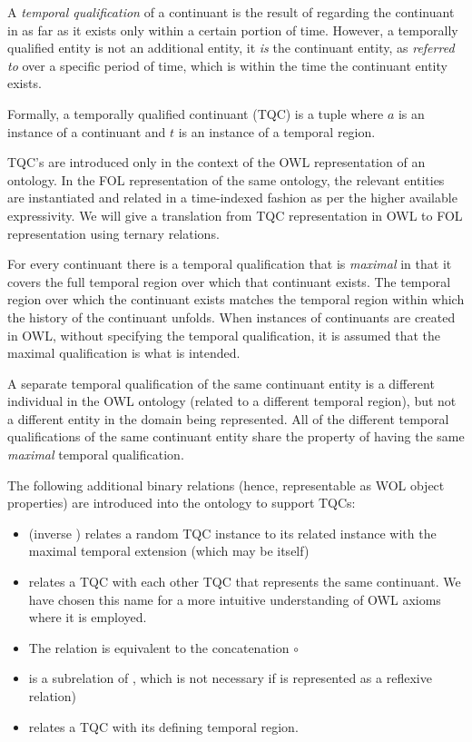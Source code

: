 
A \emph{temporal qualification} of a
continuant is the result of regarding the continuant in as far as it exists only
within a certain portion of time. However, a temporally qualified entity is
not an additional entity, it \emph{is} the continuant entity, as \emph{referred to}
over a specific period of time, which is within the time the continuant entity
exists.

Formally, a temporally qualified continuant (TQC) is a tuple 
where $a$ is an instance
of a continuant and $t$ is an instance of a temporal region.

TQC's are introduced only in the context of the OWL representation of
an ontology. In the FOL representation of the same ontology, the relevant
entities are instantiated and related in a time-indexed fashion
as per the higher available expressivity.
We will give a translation from TQC representation in OWL to
FOL representation using ternary relations.

For every continuant there is a temporal qualification that is \textit{maximal} 
in that it covers the full temporal region over which that continuant exists. 
The temporal region over which the continuant exists matches the temporal region 
within which the history of the continuant unfolds. When instances of continuants 
are created in OWL, without specifying the temporal qualification, 
it is assumed that the maximal qualification is what is intended.

A separate temporal qualification of the same continuant entity is 
a different individual in the OWL ontology (related to a different 
temporal region), but not a different entity in the domain being 
represented. All of the different temporal qualifications of the 
same continuant entity share the property of having the same \emph{maximal} 
temporal qualification.

The following additional binary relations (hence, representable as WOL object properties) 
are introduced into the ontology to support 
TQCs:
\begin{itemize}
    \item {} (inverse ) relates a random TQC instance to its related instance 
    with the maximal temporal extension (which may be itself)
    \item {} relates a TQC with each other TQC that represents the same continuant. We have
    chosen this name for a more intuitive understanding of OWL axioms where it is employed.
    \item The relation  is equivalent to the concatenation  $\circ$ 
    \item {} is a subrelation of , which is not necessary if  is represented as a 
    reflexive relation)
    \item {} relates a TQC with its defining temporal region.
\end{itemize}


